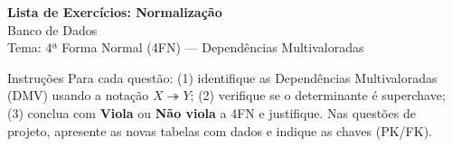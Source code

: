 \documentclass[12pt]{article}
\begin{document}
\vspace*{0.2cm}
\begin{center}
  {\Large \textbf{Lista de Exercícios: Normalização}}\\[0.2cm]
  {\large Banco de Dados}\\[0.2cm]
  Tema: 4ª Forma Normal (4FN) --- Dependências Multivaloradas
\end{center}

\vspace{0.3cm}

\begin{block}{Instruções}
Para cada questão: (1) identifique as Dependências Multivaloradas (DMV) usando a notação $X \twoheadrightarrow Y$; (2) verifique se o determinante é superchave; (3) conclua com \textbf{Viola} ou \textbf{Não viola} a 4FN e justifique. Nas questões de projeto, apresente as novas tabelas com dados e indique as chaves (PK/FK).
\end{block}

\vspace{0.4cm}
\end{document}
